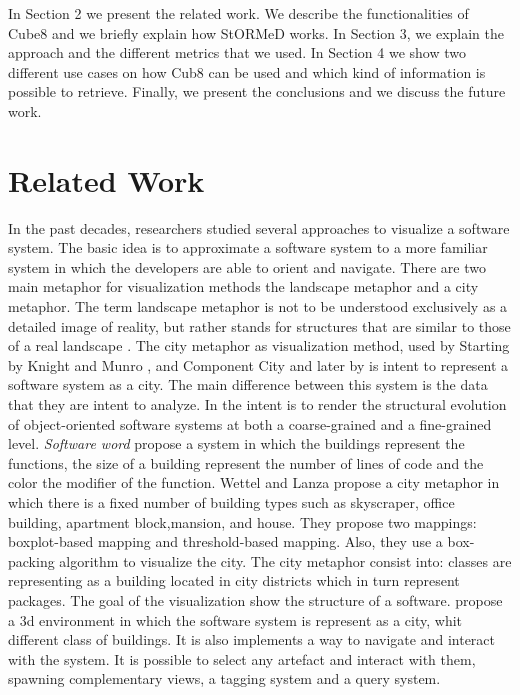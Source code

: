\documentclass[]{usiinfbachelorproject}
\newcommand {\stormed}[0]{StORMeD\xspace}
\begin{document}
In Section 2 we present the related work. We describe the functionalities of Cube8 and we briefly explain how \stormed works. In Section 3, we explain the approach and the different metrics that we used. In Section 4 we show two different use cases on how Cub8 can be used and which kind of information is possible to retrieve. Finally, we present the conclusions and we discuss the future work.


\newpage


  
\section{Related Work} \label{related works}

In the past decades, researchers studied several  approaches to visualize a software system.
The basic idea is to approximate a software system to a more familiar system in which the developers are able to orient and navigate. 
There are two main metaphor for visualization methods the landscape metaphor and a city metaphor. The term landscape metaphor is not to be understood exclusively as a detailed image of reality, but rather stands for structures that are similar to those of a real landscape \cite{LS}.
The city metaphor as visualization method, used by   Starting  by Knight and Munro \cite{SoftwareWorld}, and Component City \cite{IDM} and later by \cite{vssac,programComp} is intent to represent a software system as a city. The main difference between this system is the data that they are intent to analyze.
In \cite{Evolution}  the intent is to render the structural evolution of object-oriented software systems at both a coarse-grained and a fine-grained level.
\textit{Software word} \cite{SoftwareWorld} propose a system in which the buildings represent the functions, the size of a building represent the number of lines of code and the color the modifier of the function.
Wettel and Lanza \cite{programComp} propose a city metaphor in which there is a fixed number  of building types such as skyscraper, office building, apartment block,mansion, and house. They propose two mappings: boxplot-based mapping and threshold-based mapping. Also, they use a box-packing algorithm to visualize the city. The city metaphor consist into: classes are representing as a building located in city districts which in turn represent packages. The goal of the visualization show the structure of a software.  \cite{vssac}  propose a 3d environment in which the software system is represent as a city, whit different class of buildings. It is also implements a way to navigate and interact with the system. It is possible to select any artefact and interact with them, spawning complementary views,  a tagging system and a query system.
\end{document}
